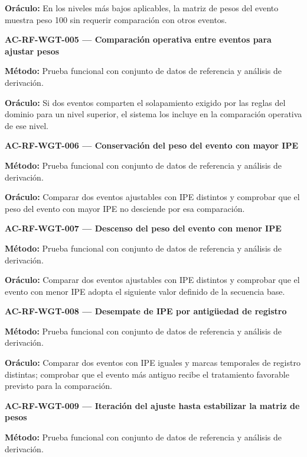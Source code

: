 \documentclass[10pt,letterpaper]{article}
\begin{document}
\textbf{Oráculo:} En los niveles más bajos aplicables, la matriz de pesos del evento muestra peso 100 sin requerir comparación con otros eventos.\par\vspace{0.45em}
\noindent\textbf{AC-RF-WGT-005 --- Comparación operativa entre eventos para ajustar pesos}\par
\textbf{Método:} Prueba funcional con conjunto de datos de referencia y análisis de derivación.\par
\textbf{Oráculo:} Si dos eventos comparten el solapamiento exigido por las reglas del dominio para un nivel superior, el sistema los incluye en la comparación operativa de ese nivel.\par\vspace{0.45em}
\noindent\textbf{AC-RF-WGT-006 --- Conservación del peso del evento con mayor IPE}\par
\textbf{Método:} Prueba funcional con conjunto de datos de referencia y análisis de derivación.\par
\textbf{Oráculo:} Comparar dos eventos ajustables con IPE distintos y comprobar que el peso del evento con mayor IPE no desciende por esa comparación.\par\vspace{0.45em}
\noindent\textbf{AC-RF-WGT-007 --- Descenso del peso del evento con menor IPE}\par
\textbf{Método:} Prueba funcional con conjunto de datos de referencia y análisis de derivación.\par
\textbf{Oráculo:} Comparar dos eventos ajustables con IPE distintos y comprobar que el evento con menor IPE adopta el siguiente valor definido de la secuencia base.\par\vspace{0.45em}
\noindent\textbf{AC-RF-WGT-008 --- Desempate de IPE por antigüedad de registro}\par
\textbf{Método:} Prueba funcional con conjunto de datos de referencia y análisis de derivación.\par
\textbf{Oráculo:} Comparar dos eventos con IPE iguales y marcas temporales de registro distintas; comprobar que el evento más antiguo recibe el tratamiento favorable previsto para la comparación.\par\vspace{0.45em}
\noindent\textbf{AC-RF-WGT-009 --- Iteración del ajuste hasta estabilizar la matriz de pesos}\par
\textbf{Método:} Prueba funcional con conjunto de datos de referencia y análisis de derivación.\par
\end{document}
